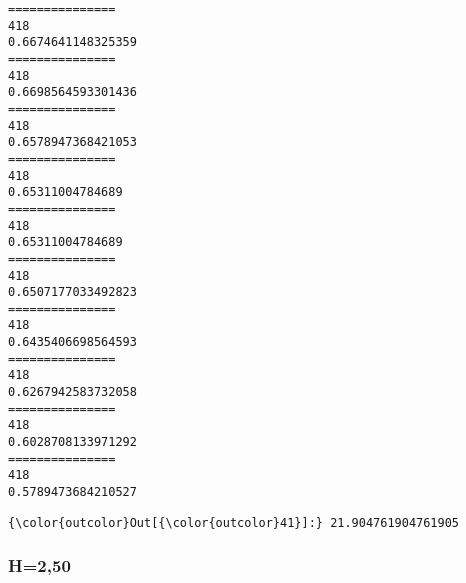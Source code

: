 \documentclass[11pt]{article}
\begin{document}
    \begin{Verbatim}[commandchars=\\\{\}]
===============
418
0.6674641148325359
===============
418
0.6698564593301436
===============
418
0.6578947368421053
===============
418
0.65311004784689
===============
418
0.65311004784689
===============
418
0.6507177033492823
===============
418
0.6435406698564593
===============
418
0.6267942583732058
===============
418
0.6028708133971292
===============
418
0.5789473684210527

    \end{Verbatim}

\begin{Verbatim}[commandchars=\\\{\}]
{\color{outcolor}Out[{\color{outcolor}41}]:} 21.904761904761905
\end{Verbatim}
            
    \subsubsection{H=2,50}\label{h250}
\end{document}
